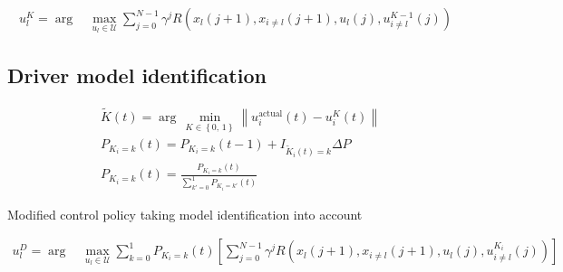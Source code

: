 \documentclass[10pt,journal]{IEEEtran}
\begin{document}
	
	
	\begin{align}
	u_{l}^K = \arg \, & \underset{u_{l} \in \mathcal{U}}{\max} \sum _{j=0}^{N-1} \gamma ^j R\left(x_{l}\left(j+1\right), x_{i\neq l}\left(j+1\right), u_{l}\left(j\right), u_{i \neq l}^{K-1}\left(j\right) \right)\nonumber
	\end{align}
	
	
	\subsection{Driver model identification}
	
	\begin{align}
	&\tilde{K}\left(t\right) = \arg \, \underset{K \in \left\{0,\,1 \right\}} {\min} \left\| u_{i}^{\text{actual}} \left(t\right) - u_{i}^{K} \left(t\right) \right\| \nonumber \\ 
	& P_{K_i = k}\left(t\right) = P_{K_i = k}\left(t-1\right) + I_{\tilde{K}_i\left(t\right) = k} \Delta P \nonumber \\ 
	& P_{K_i = k}\left(t\right) = \frac{P_{K_i = k}\left(t\right) }{\sum_{k' = 0}^{1} P_{K_i = k'}\left(t\right) }\nonumber 
	\end{align}
	
	
	Modified control policy taking model identification into account
	
	\begin{align}
	{u}_{l}^D = \arg \, & \underset{u_{l} \in \mathcal{U}}{\max} \sum_{k = 0}^{1} P_{K_i = k}\left(t\right) \left[ \sum _{j=0}^{N-1} \gamma ^j R\left(x_{l}\left(j+1\right), x_{i\neq l}\left(j+1\right), u_{l}\left(j\right), u_{i \neq l}^{K_i}\left(j\right) \right)\right]\nonumber
	\end{align}
	
\end{document}

